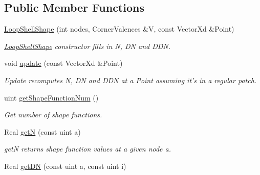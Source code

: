 \subsection*{Public Member Functions}
\begin{DoxyCompactItemize}
\item 
\hypertarget{classvoom_1_1_loop_shell_shape_a298f36512cc5d62d8c7b5ad84d2884e0}{
\hyperlink{classvoom_1_1_loop_shell_shape_a298f36512cc5d62d8c7b5ad84d2884e0}{LoopShellShape} (int nodes, CornerValences \&V, const VectorXd \&Point)}
\label{classvoom_1_1_loop_shell_shape_a298f36512cc5d62d8c7b5ad84d2884e0}

\begin{DoxyCompactList}\small\item\em \hyperlink{classvoom_1_1_loop_shell_shape}{LoopShellShape} constructor fills in N, DN and DDN. \item\end{DoxyCompactList}\item 
void \hyperlink{classvoom_1_1_loop_shell_shape_a0f3ec909fbedcb9f2c3bb073e054fdf0}{update} (const VectorXd \&Point)
\begin{DoxyCompactList}\small\item\em Update recomputes N, DN and DDN at a Point assuming it's in a regular patch. \item\end{DoxyCompactList}\item 
\hypertarget{classvoom_1_1_loop_shell_shape_a91f3300bb688b5f6ba25143ac2a291eb}{
uint \hyperlink{classvoom_1_1_loop_shell_shape_a91f3300bb688b5f6ba25143ac2a291eb}{getShapeFunctionNum} ()}
\label{classvoom_1_1_loop_shell_shape_a91f3300bb688b5f6ba25143ac2a291eb}

\begin{DoxyCompactList}\small\item\em Get number of shape functions. \item\end{DoxyCompactList}\item 
\hypertarget{classvoom_1_1_loop_shell_shape_a10f952470460fac850a89b9451c07339}{
Real \hyperlink{classvoom_1_1_loop_shell_shape_a10f952470460fac850a89b9451c07339}{getN} (const uint a)}
\label{classvoom_1_1_loop_shell_shape_a10f952470460fac850a89b9451c07339}

\begin{DoxyCompactList}\small\item\em getN returns shape function values at a given node a. \item\end{DoxyCompactList}\item 
\hypertarget{classvoom_1_1_loop_shell_shape_a7ec7dba8dc352dea087ab20cae63de80}{
Real \hyperlink{classvoom_1_1_loop_shell_shape_a7ec7dba8dc352dea087ab20cae63de80}{getDN} (const uint a, const uint i)}
\label{classvoom_1_1_loop_shell_shape_a7ec7dba8dc352dea087ab20cae63de80}


\end{DoxyCompactItemize}
